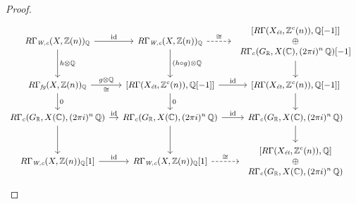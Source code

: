 \begin{proposition}
\begin{proof}
    \begin{equation}
      \label{eqn:splitting-of-RGammaWc-TR3}
      \begin{tikzcd}[column sep=1em,font=\small]
        R\Gamma_\text{\it W,c} (X, \ZZ (n))_\QQ \ar{d}{h\otimes\QQ}\ar{r}{\idid} & R\Gamma_\text{\it W,c} (X, \ZZ (n))_\QQ \ar{d}{(h\circ g)\otimes\QQ}\ar[dashed]{r}{\isom} & {\begin{array}{c}[R\Gamma (X_\text{\it ét}, \ZZ^c (n)), \QQ [-1]]\\ \oplus \\ R\Gamma_c (G_\RR, X (\CC), (2\pi i)^n\,\QQ) [-1] \end{array}} \ar{d} \\
        R\Gamma_\text{\it fg} (X, \ZZ (n))_\QQ \ar{d}{0}\ar{r}{g\otimes\QQ}[swap]{\isom} &  {[R\Gamma (X_\text{\it ét}, \ZZ^c (n)), \QQ [-1]]} \ar{d}{0}\ar{r}{\idid} & {[R\Gamma (X_\text{\it ét}, \ZZ^c (n)), \QQ [-1]]} \ar{d} \\
        R\Gamma_c (G_\RR, X (\CC), (2\pi i)^n\,\QQ) \ar{d}\ar{r}{\idid} & R\Gamma_c (G_\RR, X (\CC), (2\pi i)^n\,\QQ) \ar{d}\ar{r}{\idid} & R\Gamma_c (G_\RR, X (\CC), (2\pi i)^n\,\QQ) \ar{d} \\
        R\Gamma_\text{\it W,c} (X, \ZZ (n))_\QQ [1]\ar{r}{\idid} & R\Gamma_\text{\it W,c} (X, \ZZ (n))_\QQ [1]\ar[dashed]{r}{\isom} & {\begin{array}{c}[R\Gamma (X_\text{\it ét}, \ZZ^c (n)), \QQ] \\\oplus \\R\Gamma_c (G_\RR, X (\CC), (2\pi i)^n\,\QQ)\end{array}}
      \end{tikzcd}
    \end{equation}


\end{proof}
\end{proposition}
